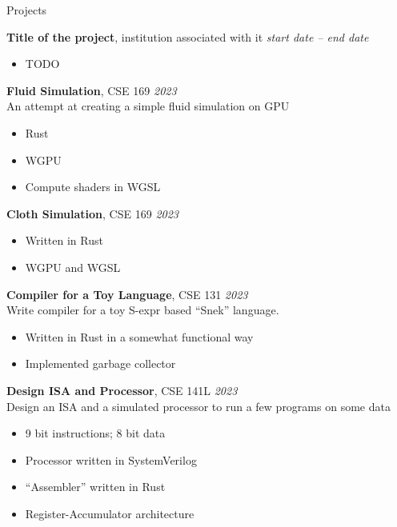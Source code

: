 	\begin{rSection}{Projects}

		{\bf Title of the project}{, institution associated with it} \hfill {\em start date -- end date}
		\begin{multicols}{2}
			\begin{itemize}
				\item TODO
			\end{itemize}
		\end{multicols}

		{\bf Fluid Simulation}{, CSE 169} \hfill {\em 2023} \\
		An attempt at creating a simple fluid simulation on GPU
		\begin{multicols}{2}
			\begin{itemize}
				\item Rust
				\item WGPU
				\item Compute shaders in WGSL
			\end{itemize}
		\end{multicols}

		{\bf Cloth Simulation}{, CSE 169} \hfill {\em 2023}
		\begin{multicols}{2}
			\begin{itemize}
				\item Written in Rust
				\item WGPU and WGSL
			\end{itemize}
		\end{multicols}

		{\bf Compiler for a Toy Language}{, CSE 131} \hfill {\em 2023} \\
		Write compiler for a toy S-expr based ``Snek'' language.
		\begin{multicols}{2}
			\begin{itemize}
				\item Written in Rust in a somewhat functional way
				\item Implemented garbage collector
			\end{itemize}
		\end{multicols}

		{\bf Design ISA and Processor}{, CSE 141L} \hfill {\em 2023} \\
		Design an ISA and a simulated processor to run a few programs on some data
		\begin{multicols}{2}
			\begin{itemize}
				\item 9 bit instructions; 8 bit data
				\item Processor written in SystemVerilog
				\item ``Assembler'' written in Rust
				\item Register-Accumulator architecture
			\end{itemize}
		\end{multicols}


\end{rSection}
